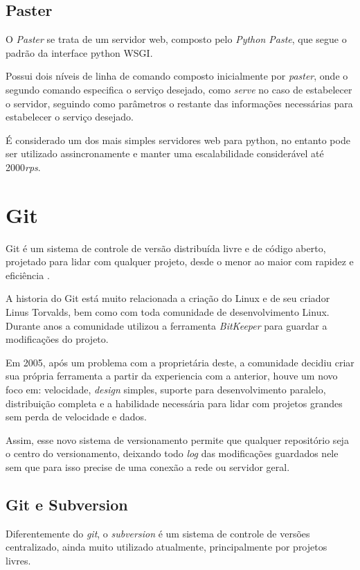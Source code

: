 \subsection{Paster}

O \textit{Paster} se trata de um servidor web, composto pelo \textit{Python Paste}, que segue o padrão da interface python WSGI.

Possui dois níveis de linha de comando composto inicialmente por \textit{paster}, onde o segundo comando especifica o serviço desejado, como \textit{serve} no caso de estabelecer o servidor, seguindo como parâmetros o restante das informações necessárias para estabelecer o serviço desejado.

É considerado um dos mais simples servidores web para python, no entanto pode ser utilizado assincronamente e manter uma escalabilidade considerável até 2000\textit{rps}.

\section{Git}

Git é um sistema de controle de versão distribuída livre e de código aberto, projetado para lidar com qualquer projeto, desde o menor ao maior com rapidez e eficiência \cite{SOFTWARE-FREEDOM-CONSERVANCY}.

A historia do Git está muito relacionada a criação do Linux e de seu criador Linus Torvalds, bem como com toda comunidade de desenvolvimento Linux. Durante anos a comunidade utilizou a ferramenta \textit{BitKeeper} para guardar a modificações do projeto.

Em 2005, após um problema com a proprietária deste, a comunidade decidiu criar sua própria ferramenta a partir da experiencia com a anterior, houve um novo foco em: velocidade, \textit{design} simples, suporte para desenvolvimento paralelo, distribuição completa e a habilidade necessária para lidar com projetos grandes sem perda de velocidade e dados.

Assim, esse novo sistema de versionamento permite que qualquer repositório seja o centro do versionamento, deixando todo \textit{log} das modificações guardados nele sem que para isso precise de uma conexão a rede ou servidor geral.

\subsection{Git e Subversion}

Diferentemente do \textit{git}, o \textit{subversion} é um sistema de controle de versões centralizado, ainda muito utilizado atualmente, principalmente por projetos livres.

